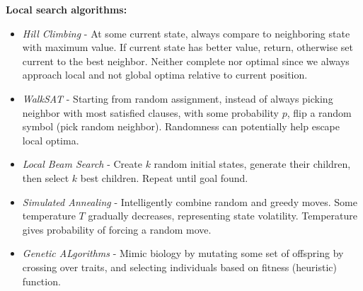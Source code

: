 \documentclass[a4paper,10pt,twocolumn]{article}
\begin{document}
\begin{tcolorbox}[title=Heuristic Search, module]
    \textbf{Local search algorithms:}
    \begin{itemize}
        \item \textit{Hill Climbing} - At some current state, always compare to neighboring state with maximum value. If current state has better value, return, otherwise set current to the best neighbor. Neither complete nor optimal since we always approach local and not global optima relative to current position.
        \item \textit{WalkSAT} - Starting from random assignment, instead of always picking neighbor with most satisfied clauses, with some probability $p$, flip a random symbol (pick random neighbor). Randomness can potentially help escape local optima.
        \item \textit{Local Beam Search} - Create $k$ random initial states, generate their children, then select $k$ best children. Repeat until goal found.
        \item \textit{Simulated Annealing} - Intelligently combine random and greedy moves. Some temperature $T$ gradually decreases, representing state volatility. Temperature gives probability of forcing a random move.
        \item \textit{Genetic ALgorithms} - Mimic biology by mutating some set of offspring by crossing over traits, and selecting individuals based on fitness (heuristic) function.
    \end{itemize}

\end{tcolorbox}
\end{document}
